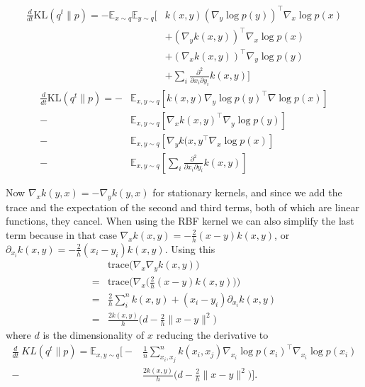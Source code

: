 \documentclass{article}
\begin{document}
    \begin{align}
        \frac{d}{dt} \text{KL}( q^t \| p ) = - \mathbb{E}_{x\sim q} \mathbb{E}_{y \sim q} \big[
            & k(x,y) (\nabla_y \log p(y))^\top \nabla_x \log p(x) \\
            &+ (\nabla_y k(x,y) )^\top \nabla_x \log p(x) \\
            &+ (\nabla_x k(x,y) )^\top \nabla_y \log p(y) \\
            &+ \sum_i \frac{ \partial^2 }{ \partial x_i \partial y_i } k(x,y) \big]
    \end{align}
    \begin{align}
        \frac{d}{dt} \text{KL} ( q^t \| p ) =
        -& \mathbb{E}_{x,y\sim q} \left[ k(x,y) \nabla_y \log p(y)^\top \nabla \log p(x) \right] \\ 
        -& \mathbb{E}_{x,y\sim q} \left[ \nabla_x k(x,y)^\top \nabla_y \log p(y) \right] \\ 
        -& \mathbb{E}_{x,y\sim q} \left[ \nabla_y k(x,y^\top \nabla_x \log p(x) \right] \\ 
        -& \mathbb{E}_{x,y\sim q} \left[ \sum_i \frac{ \partial^2 }{ \partial x_i \partial y_i } k(x,y) \right]
    \end{align}

    Now $\nabla_x k(y,x) = - \nabla_y k(y,x)$ for stationary kernels, and since we add the trace and the expectation of 
    the second and third terms, both of which are linear functions, they cancel.
    When using the RBF kernel we can also simplify the last term because in that case $\nabla_x k(x,y) = -\frac{2}{h} (x-y) k(x,y) $,
    or $\partial_{x_i} k(x,y) = -\frac{2}{h} (x_i - y_i) k(x,y)$. Using this 
    \begin{align}
        &\text{trace} \Big( \nabla_x \nabla_y k(x,y) \Big) \\
        = &\text{trace} \Big( \nabla_x \big( \frac{2}{h} (x-y)k(x,y) \big) \Big) \\
        = &\frac{2}{h} \sum_{i}^{n} k(x,y) + (x_i - y_i) \partial_{x_i} k(x,y) \\
        = & \frac{2k(x,y)}{h}\Big( d - \frac{2}{h}\|x-y\|^2 \Big)
    \end{align}
    where $d$ is the dimensionality of $x$
    reducing the derivative to
    \begin{align}
        \frac{d}{dt}\ KL( q^t \| p ) =\mathbb{E}_{x,y\sim q} \Bigg[ -& \frac{1}{n}\sum_{x_i,x_j}^n  k(x_i,x_j) \nabla_{x_i} \log p(x_i)^\top \nabla_{x_i} \log p(x_i)  \\ 
        -& \frac{2k(x,y)}{h}\Big( d - \frac{2}{h}\|x-y\|^2 \Big)\Bigg].
    \end{align}
\end{document}
